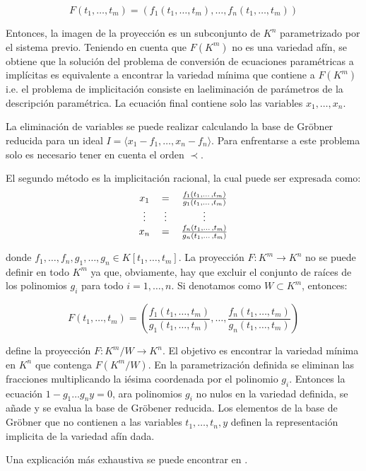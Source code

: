 $$F(t_1,\dotso, t_m) = (f_1(t_1,\dotso, t_m), \dotso, f_n(t_1,\dotso, t_m))$$

Entonces, la imagen de la proyección es un subconjunto de $K^n$ parametrizado por el sistema previo. Teniendo en cuenta que $F(K^m)$ no es una variedad afín, se obtiene que la solución del problema de conversión de ecuaciones paramétricas a implícitas es equivalente a encontrar la variedad mínima que contiene a $F(K^m)$ i.e. el problema de implicitación consiste en laeliminación de parámetros de la descripción paramétrica. La ecuación final contiene solo las variables $x_1, \dotso, x_n$.
\par
La eliminación de variables se puede realizar calculando la base de Gröbner reducida para un ideal $I = \langle x_1 - f_1, \dotso, x_n - f_n \rangle$. Para enfrentarse a este problema solo es necesario tener en cuenta el orden $\prec$.
\par
El segundo método es la implicitación racional, la cual puede ser expresada como:
\begin{equation}
\begin{tabular}{c c c}
$x_1$ & $=$ & $\frac{f_1(t_1, \dotso, t_m)}{g_1(t_1, \dotso, t_m)}$ \\
$\vdots$ & $\vdots$ & $\vdots$ \\
$x_n$ & $=$ & $\frac{f_n(t_1, \dotso, t_m)}{g_n(t_1, \dotso, t_m)}$
\end{tabular}
\nonumber
\end{equation}

donde $f_1, \dotso, f_n, g_1, \dotso, g_n \in K[t_1, \dotso, t_m]$. La proyección $F : K^m \to K^n$ no se puede definir en todo $K^m$ ya que, obviamente, hay que excluir el conjunto de raíces de los polinomios $g_i$ para todo $i = 1, \dotso, n$. Si denotamos como $W \subset K^m$, entonces:

$$F(t_1, \dotso, t_m) = \left( \frac{f_1(t_1, \dotso, t_m)}{g_1(t_1, \dotso, t_m)}, \dotso, \frac{f_n(t_1, \dotso, t_m)}{g_n(t_1, \dotso, t_m)}  \right)$$

define la proyección $F : K^m / W \to K^n $. El objetivo es encontrar la variedad mínima en $K^n$ que contenga $F(K^m / W)$. En la parametrización definida se eliminan las fracciones multiplicando la iésima coordenada por el polinomio $g_i$. Entonces la ecuación $1 - g_1 \dotso g_n y = 0$, ara polinomios $g_i$ no nulos en la variedad definida, se añade  y se evalua la base de Gröbener reducida. Los elementos de la base de Gröbner que no contienen a las variables $t_1, \dotso, t_n, y$ definen la representación implicita de la variedad afín dada.
\par
Una explicación más exhaustiva se puede encontrar en \cite{Hoffmann93}.
